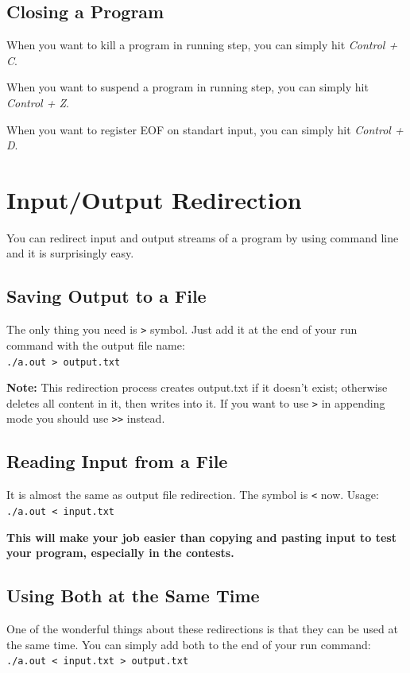 \documentclass[12pt]{article}
\begin{document}
\subsection{Closing a Program}
When you want to kill a program in running step, you can simply hit \emph{Control + C}.

When you want to suspend a program in running step, you can simply hit \emph{Control + Z}.

When you want to register EOF on standart input, you can simply hit \emph{Control + D}.

\section{Input/Output Redirection}
You can redirect input and output streams of a program by using command line and it is surprisingly easy.
\subsection{Saving Output to a File}
The only thing you need is \texttt{>} symbol. Just add it at the end of your run command with the output file name:\\
\texttt{./a.out > output.txt}

\textbf{Note:} This redirection process creates output.txt if it doesn't exist; otherwise deletes all content in it, then writes into it. If you want to use \texttt{>} in appending mode you should use \texttt{>>} instead.

\subsection{Reading Input from a File}
It is almost the same as output file redirection. The symbol is \texttt{<} now. Usage: \\
\texttt{./a.out < input.txt}


\textbf{This will make your job easier than copying and pasting input to test your program, especially in the contests.}

\subsection{Using Both at the Same Time}
One of the wonderful things about these redirections is that they can be used at the same time. You can simply add both to the end of your run command:\\
\texttt{./a.out < input.txt > output.txt}
\end{document}
